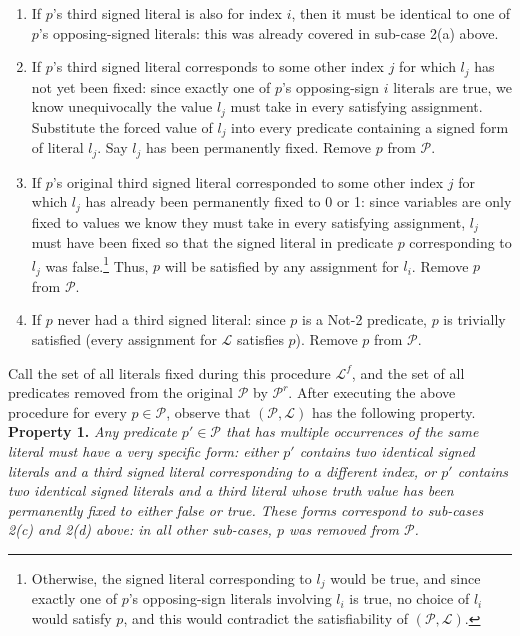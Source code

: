 \documentclass{article}
\begin{document}
\begin{enumerate}
\begin{enumerate}
\item If $p$'s third signed literal is also for index $i$, then it must be identical to one of $p$'s opposing-signed literals: this was already covered in sub-case 2(a) above.
\item  If $p$'s third signed literal corresponds to some other index $j$ for which $l_j$ has not yet been fixed: since exactly one of $p$'s opposing-sign $i$ literals are true, we know unequivocally the value $l_j$ must take in every satisfying assignment. Substitute the forced value of $l_j$ into every predicate containing a signed form of literal $l_j$. Say $l_j$ has been permanently fixed. 
 Remove 
$p$ from $\mathcal{P}$. 
\item If $p$'s original third signed literal corresponded to some other index $j$ for which $l_j$ has already been permanently fixed to 0 or 1: since variables are only fixed to values we know they must take in every satisfying assignment, $l_j$ must have been fixed so that the signed literal in predicate $p$ corresponding to $l_j$ was false.\footnote{Otherwise, the signed literal corresponding to $l_j$ would be true, and since exactly one of $p$'s opposing-sign literals involving $l_i$ is true, no choice of $l_i$ would satisfy $p$, and this would contradict the satisfiability of $(\mathcal{P}, \mathcal{L})$. } Thus, $p$ will be satisfied by any assignment for $l_i$. Remove $p$ from $\mathcal{P}$.

\item If $p$ never had a third signed literal: since $p$ is a Not-2 predicate, $p$ is trivially satisfied (every assignment for $\mathcal{L}$ satisfies $p$). Remove $p$ from $\mathcal{P}$.

\end{enumerate}
\end{enumerate}


Call the set of all literals fixed during this procedure $\mathcal{L}^f$, and the set of all predicates removed from the original $\mathcal{P}$ by $\mathcal{P}^r$.
After executing the above procedure for every $p\in \mathcal{P}$, observe that $(\mathcal{P}, \mathcal{L})$ has the following property.  \\

\noindent \textbf{Property 1.} \textit{Any predicate $p'\in \mathcal{P}$ that has multiple occurrences of the same literal must have a very specific form: either $p'$ contains two identical signed literals and a third signed literal corresponding to a different index, or  $p'$ contains two identical signed literals and a third literal whose truth value has been permanently fixed to either false or true. These forms correspond to sub-cases 2(c) and 2(d) above: in all other sub-cases, $p$ was removed from $\mathcal{P}$.}\\
\end{document}
